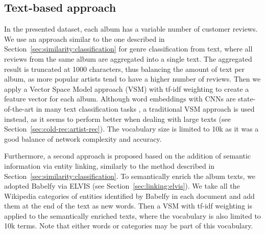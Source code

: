 \subsection{Text-based approach}
\label{sec:multi-class:text}
In the presented dataset, each album has a variable number of customer reviews. 
We use an approach similar to the one described in Section~\ref{sec:similarity:classification} for genre classification from text, where all reviews from the same album are aggregated into a single text. 
The aggregated result is truncated at 1000 characters, thus balancing the amount of text per album, as more popular artists tend to have a higher number of reviews. %
Then we apply a Vector Space Model approach (VSM) with tf-idf weighting \citep{Zobel1998} to create a feature vector for each album. 
Although word embeddings \citep{Mikolov2013} with CNNs are state-of-the-art in many text classification tasks \citep{Kim2014}, a traditional VSM approach is used instead, as it seems to perform better when dealing with large texts (see Section~\ref{sec:cold-rec:artist-rec}).
The vocabulary size is limited to 10k as it was a good balance of network complexity and accuracy.%

Furthermore, a second approach is proposed based on the addition of semantic information via entity linking, similarly to the method described in Section~\ref{sec:similarity:classification}. 
To semantically enrich the album texts, we adopted Babelfy \citep{Moroetal2014} via ELVIS (see Section~\ref{sec:linking:elvis}).%
We take all the Wikipedia categories of entities identified by Babelfy in each document and add them at the end of the text as new words. 
Then a VSM with tf-idf weighting is applied to the semantically enriched texts, where the vocabulary is also limited to 10k terms. 
Note that either words or categories may be part of this vocabulary. 

